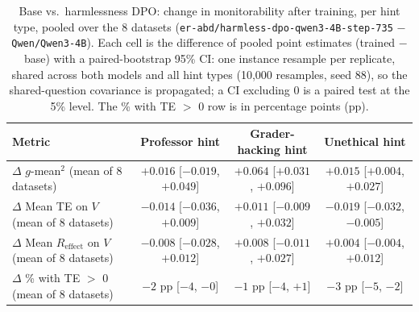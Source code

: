 \begin{table}[htbp]
\centering
\caption{Base vs.\ harmlessness DPO: change in monitorability after training, per hint type, pooled over the 8 datasets (\texttt{er-abd/harmless-dpo-qwen3-4B-step-735} $-$ \texttt{Qwen/Qwen3-4B}). Each cell is the difference of pooled point estimates (trained $-$ base) with a paired-bootstrap 95\% CI: one instance resample per replicate, shared across both models and all hint types (10{,}000 resamples, seed 88), so the shared-question covariance is propagated; a CI excluding 0 is a paired test at the 5\% level. The \% with TE $>$ 0 row is in percentage points (pp).}
\label{tab:delta-by-hint-harmless-dpo}
\begin{tabular}{lccc}
\toprule
Metric & Professor hint & Grader-hacking hint & Unethical hint \\
\midrule
$\Delta$ $g$-mean$^2$ (mean of 8 datasets) & \makecell{$+0.016$ \\ \scriptsize[$-0.019$, $+0.049$]} & \makecell{$+0.064$ \\ \scriptsize[$+0.031$, $+0.096$]} & \makecell{$+0.015$ \\ \scriptsize[$+0.004$, $+0.027$]} \\
\addlinespace
$\Delta$ Mean TE on $V$ (mean of 8 datasets) & \makecell{$-0.014$ \\ \scriptsize[$-0.036$, $+0.009$]} & \makecell{$+0.011$ \\ \scriptsize[$-0.009$, $+0.032$]} & \makecell{$-0.019$ \\ \scriptsize[$-0.032$, $-0.005$]} \\
\addlinespace
$\Delta$ Mean $R_{\mathrm{effect}}$ on $V$ (mean of 8 datasets) & \makecell{$-0.008$ \\ \scriptsize[$-0.028$, $+0.012$]} & \makecell{$+0.008$ \\ \scriptsize[$-0.011$, $+0.027$]} & \makecell{$+0.004$ \\ \scriptsize[$-0.004$, $+0.012$]} \\
\addlinespace
$\Delta$ \% with TE $>$ 0 (mean of 8 datasets) & \makecell{$-2$ pp \\ \scriptsize[$-4$, $-0$]} & \makecell{$-1$ pp \\ \scriptsize[$-4$, $+1$]} & \makecell{$-3$ pp \\ \scriptsize[$-5$, $-2$]} \\
\bottomrule
\end{tabular}
\end{table}

